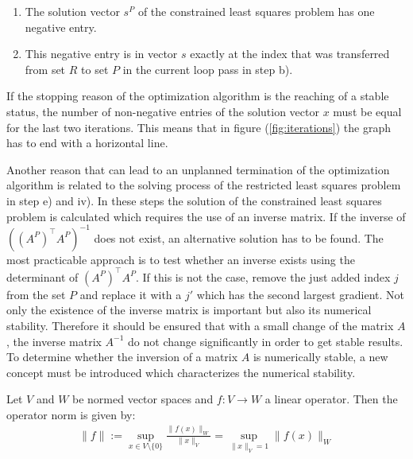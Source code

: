 \begin{enumerate}
	\item The solution vector $s^P$ of the constrained least squares problem has one negative entry.
	\item This negative entry is in vector $s$ exactly at the index that was transferred from set $R$ to set $P$ in the current loop pass in step b).
\end{enumerate}


\begin{remark}
	If the stopping reason of the optimization algorithm is the reaching of a stable status, the number of non-negative entries of the solution vector $x$ must be equal for the last two iterations. This means that in figure (\ref{fig:iterations}) the graph has to end with a horizontal line.
\end{remark}

Another reason that can lead to an unplanned termination of the optimization algorithm is related to the solving process of the restricted least squares problem in step e) and iv). In these steps the solution of the constrained least squares problem is calculated which requires the use of an inverse matrix. If the inverse of $((A^P)^\top A^P)^{-1}$ does not exist, an alternative solution has to be found. The most practicable approach is to test whether an inverse exists using the determinant of $(A^P)^\top A^P$. If this is not the case, remove the just added index $j$ from the set $P$ and replace it with a $j'$ which has the second largest gradient. 
Not only the existence of the inverse matrix is important but also its numerical stability. Therefore it should be ensured that with a small change of the matrix $A$, the inverse matrix $A^{-1}$ do not change significantly in order to get stable results. To determine whether the inversion of a matrix $A$ is numerically stable, a new concept must be introduced which characterizes the numerical stability.



\begin{definition}
	Let $V$ and $W$ be normed vector spaces and $f:V \to W$ a linear operator. Then the operator norm is given by: 
	\begin{align}\label{eq:operator_Norm}
		\lVert f \rVert := \sup_{x \in V \setminus \{0\}} \frac{\lVert f(x) \rVert_W}{\lVert x \rVert_V} = \sup_{\lVert x \rVert_{V} = 1} \lVert f(x) \rVert_W
	\end{align}
\end{definition}

